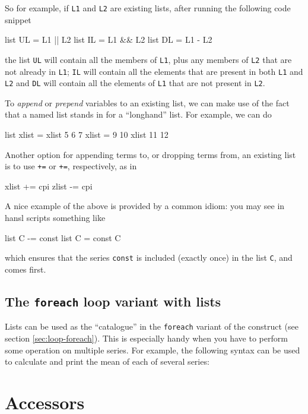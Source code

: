 So for example, if \texttt{L1} and \texttt{L2} are existing lists,
after running the following code snippet
\begin{code}
  list UL = L1 || L2 
  list IL = L1 && L2
  list DL = L1 - L2
\end{code}
the list \texttt{UL} will contain all the members of \texttt{L1}, plus
any members of \texttt{L2} that are not already in \texttt{L1};
\texttt{IL} will contain all the elements that are present in both
\texttt{L1} and \texttt{L2} and \texttt{DL} will contain all the
elements of \texttt{L1} that are not present in \texttt{L2}. 

To \textit{append} or \textit{prepend} variables to an existing list,
we can make use of the fact that a named list stands in for a
``longhand'' list.  For example, we can do
%
\begin{code}
list xlist = xlist 5 6 7
xlist = 9 10 xlist 11 12
\end{code}
 
Another option for appending terms to, or dropping terms from, an
existing list is to use \texttt{+=} or \texttt{+=}, respectively, as
in
\begin{code}
xlist += cpi
zlist -= cpi
\end{code}
A nice example of the above is provided by a common idiom: you may
see in hansl scripts something like
\begin{code}
  list C -= const
  list C = const C
\end{code}
which ensures that the series \texttt{const} is included (exactly
once) in the list \texttt{C}, and comes first.

\subsection{The \texttt{foreach} loop variant with lists}

Lists can be used as the ``catalogue'' in the \texttt{foreach} variant
of the  construct (see section \ref{sec:loop-foreach}). This
is especially handy when you have to perform some operation on
multiple series. For example, the following syntax can be used to
calculate and print the mean of each of several series:

\section{Accessors}
\label{sec:accessors}
 
